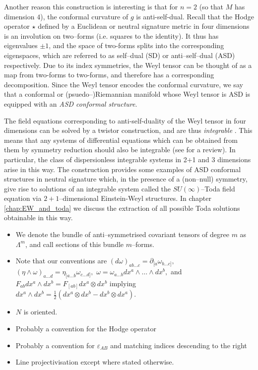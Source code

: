 Another reason this construction is interesting is that for $n=2$ (so that $M$ has dimension $4$), the conformal
curvature of $g$ is anti-self-dual. Recall that the Hodge operator
$\star$ defined by a Euclidean or neutral signature metric in four
dimensions is an involution on two--forms (i.e. squares to the identity).
It thus has eigenvalues $\pm1$, and the space of two-forms splits
into the corresponding eigenspaces, which are referred to as self--dual
(SD) or anti--self--dual (ASD) respectively. Due to its index symmetries,
the Weyl tensor can be thought of as a map from two-forms to two-forms,
and therefore has a corresponding decomposition. Since the Weyl tensor
encodes the conformal curvature, we say that a conformal or (psuedo--)Riemannian
manifold whose Weyl tensor is ASD is equipped with an \textit{ASD
conformal structure}.

The field equations corresponding to anti-self-duality of the Weyl
tensor in four dimensions can be solved by a twistor construction,
and are thus \textit{integrable} \cite{ward}. This means that any systems of differential
equations which can be obtained from them by symmetry reduction should
also be integrable (see \cite{MW} for a review). In particular, the class of dispersionless
integrable systems in 2+1 and 3 dimensions arise in this way. The
construction \cite{DM} provides some examples of
ASD conformal structures in neutral signature which, in the presence
of a (non--null) symmetry, give rise to solutions of an integrable
system called the $SU(\infty)$--Toda field equation via $2+1$--dimensional
Einstein-Weyl structures. In chapter \ref{chap:EW_and_toda} we discuss the extraction
of all possible Toda solutions obtainable in this way.

\begin{itemize}
\item We denote the bundle of anti--symmetrised covariant tensors of degree $m$ as $\Lambda^m$, and call sections of this bundle $m$--forms.
\item Note that our conventions are $(d\omega)_{ab\dots c}=\partial_{[a}\omega_{b\dots c]},$
$(\eta\wedge\omega)_{a\dots d}=\eta_{[a\dots b}\omega_{c\dots d]},$
$\omega=\omega_{a\dots b}dx^{a}\wedge\dots\wedge dx^{b},$
and $F_{ab}{d}x^{a}\wedge{d}x^{b}=F_{[ab]}{d}x^{a}\otimes{d}x^{b}$
implying ${d}x^{a}\wedge{d}x^{b}=\frac{1}{2}({d}x^{a}\otimes{d}x^{b}-{d}x^{b}\otimes{d}x^{a})$.
\item $N$ is oriented. 
\item Probably a convention for the Hodge operator
\item Probably a convention for $\varepsilon_{AB}$ and matching indices descending to the right
\item Line projectivisation except where stated otherwise.
\end{itemize}

